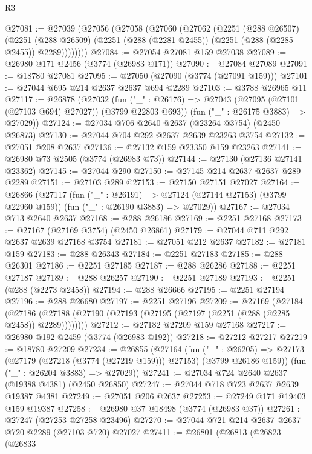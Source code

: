 \begin{lexlean}{R3}
\begin{coremodule}
@27081 := @27039
    (@27056
      (@27058
        (@27060
          (@27062
            (@2251
              (@288 @26507)
              (@2251
                (@288 @26509)
                (@2251 (@288 (@2281 @2455)) (@2251 (@288 (@2285 @2455)) @2289))))))))
@27084 := @27054 @27081 @159 @27038
@27089 := @26980 @171 @2456 (@3774 (@26983 @171))
@27090 := @27084 @27089
@27091 := @18780 @27081
@27095 := @27050 (@27090 (@3774 (@27091 @159)))
@27101 := @27044 @695 @214 @2637 @2637 @694 @2289
@27103 := @3788 @26965 @11
@27117 := @26878
    (@27032
      (fun ("_" : @26176) => @27043 (@27095 (@27101 (@27103 @694) @27027)) (@3799 @22803 @693))
      (fun ("_" : @26175 @3883) => @27029))
@27124 := @27034 @706 @2640 @2637 (@23264 @3754) (@2450 @26873)
@27130 := @27044 @704 @292 @2637 @2639 @23263 @3754
@27132 := @27051 @208 @2637
@27136 := @27132 @159 @23350 @159 @23263
@27141 := @26980 @73 @2505 (@3774 (@26983 @73))
@27144 := @27130 (@27136 @27141 @23362)
@27145 := @27044 @290
@27150 := @27145 @214 @2637 @2637 @289 @2289
@27151 := @27103 @289
@27153 := @27150 @27151 @27027
@27164 := @26866
    (@27117
      (fun ("_" : @26191) => @27124 (@27144 @27153) (@3799 @22960 @159))
      (fun ("_" : @26190 @3883) => @27029))
@27167 := @27034 @713 @2640 @2637
@27168 := @288 @26186
@27169 := @2251 @27168
@27173 := @27167 (@27169 @3754) (@2450 @26861)
@27179 := @27044 @711 @292 @2637 @2639 @27168 @3754
@27181 := @27051 @212 @2637
@27182 := @27181 @159
@27183 := @288 @26343
@27184 := @2251 @27183
@27185 := @288 @26301
@27186 := @2251 @27185
@27187 := @288 @26286
@27188 := @2251 @27187
@27189 := @288 @26257
@27190 := @2251 @27189
@27193 := @2251 (@288 (@2273 @2458))
@27194 := @288 @26666
@27195 := @2251 @27194
@27196 := @288 @26680
@27197 := @2251 @27196
@27209 := @27169
    (@27184
      (@27186 (@27188 (@27190 (@27193 (@27195 (@27197 (@2251 (@288 (@2285 @2458)) @2289))))))))
@27212 := @27182 @27209 @159 @27168
@27217 := @26980 @192 @2459 (@3774 (@26983 @192))
@27218 := @27212 @27217
@27219 := @18780 @27209
@27234 := @26855
    (@27164
      (fun ("_" : @26205) =>
      @27173 (@27179 (@27218 (@3774 (@27219 @159))) @27153) (@3799 @26186 @159))
      (fun ("_" : @26204 @3883) => @27029))
@27241 := @27034 @724 @2640 @2637 (@19388 @4381) (@2450 @26850)
@27247 := @27044 @718 @723 @2637 @2639 @19387 @4381
@27249 := @27051 @206 @2637
@27253 := @27249 @171 @19403 @159 @19387
@27258 := @26980 @37 @18498 (@3774 (@26983 @37))
@27261 := @27247 (@27253 @27258 @23496)
@27270 := @27044 @721 @214 @2637 @2637 @720 @2289 (@27103 @720) @27027
@27411 := @26801
    (@26813
      (@26823
        (@26833

\end{coremodule}
\end{lexlean}
